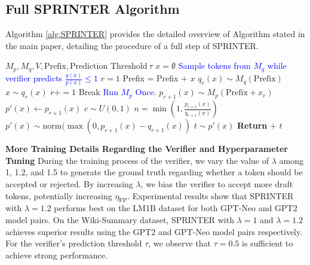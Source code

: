 \documentclass{article}
\theoremstyle{plain}
\theoremstyle{definition}
\theoremstyle{remark}
\begin{document}
\subsection{Full SPRINTER Algorithm}
\label{sec:algorithm_hyper}
Algorithm \ref{alg:SPRINTER} provides the detailed overview of Algorithm stated in the main paper, detailing the procedure of a full step of SPRINTER. 
 \begin{algorithm}[h]
   \caption{SPRINTER (detailed)}
   \label{alg:SPRINTER}
\begin{algorithmic}
    $M_p, M_q, V, \text{Prefix}, \text{Prediction Threshold}~\tau$
   \STATE $x = \emptyset$
   \STATE \textcolor{blue}{Sample tokens from $M_q$ while verifier predicts $\frac{q(x)}{p(x)}\leq 1$ }
   \STATE $r = 1$
      \STATE Prefix = Prefix + $x$
      \STATE $q_r(x) \sim M_q(\text{Prefix})$
    \STATE $x \sim q_r(x)$
    \STATE $r += 1$
    \ELSE
    \STATE Break
    \ENDIF
    \ENDWHILE
   \STATE \textcolor{blue}{Run $M_p$ Once}.
   \STATE $p_{r+1}(x) \sim M_p(\text{Prefix}+x_{r})$
   \STATE $p'(x) \leftarrow p_{r+1}(x)$
   \STATE $c \sim U(0,1)$
   \STATE $n = \min(1, \frac{p_{r+1}(x)}{q_{r+1}(x)})$
   \STATE $p'(x) \sim \text{norm}(\max(0, p_{r+1}(x)- q_{r+1}(x))$
   \ENDIF
  \STATE $t \sim p'(x)$
  \STATE \textbf{Return}  + $t$ 
\end{algorithmic}
\end{algorithm}


\textbf{More Training Details Regarding the Verifier and Hyperparameter Tuning}
During the training process of the verifier, we vary the value of \(\lambda\) among 1, 1.2, and 1.5 to generate the ground truth regarding whether a token should be accepted or rejected. By increasing $\lambda$, we bias the verifier to accept more draft tokens, potentially increasing $\eta_\text{FP}$. Experimental results show that SPRINTER with \(\lambda = 1.2\) performs best on the LM1B dataset for both GPT-Neo and GPT2 model pairs. On the Wiki-Summary dataset, SPRINTER with \(\lambda = 1\)  and \(\lambda = 1.2\) achieves superior results using the GPT2 and GPT-Neo model pairs respectively.  
For the verifier's prediction threshold \(\tau\), we observe that \(\tau = 0.5\) is sufficient to achieve strong performance. 
\end{document}
